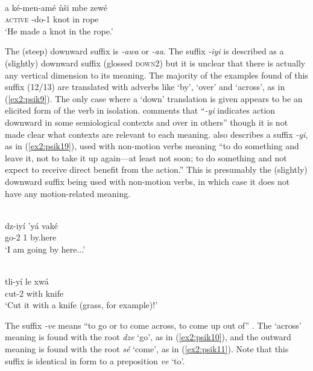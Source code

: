 \ea\label{ex2:psik8}
 \\
\gll a ké-men-amé ǹši mbe zewé	\\
\textsc{active} -do-1 knot in rope	\\
\glt `He made a knot in the rope.'
\z 

The (steep) downward suffix is \textit{-awa} or \textit{-aa}. The suffix \textit{-iyi} is described as a (slightly) downward suffix (glossed \textsc{down2}) but it is unclear that there is actually any vertical dimension to its meaning. The majority of the examples found of this suffix (12/13) are translated with adverbs like `by', `over' and `across', as in (\ref{ex2:psik9}). The only case where a `down' translation is given appears to be an elicited form of the verb in isolation. \citet[139]{smithKapsikiLanguage1969} comments that ``\textit{-yi} indicates action downward in some semiological contexts and over in others'' though it is not made clear what contexts are relevant to each meaning. \citet[114--115]{smithKapsikiLanguage1969} also describes a suffix \textit{-yi}, as in (\ref{ex2:psik19}), used with non-motion verbs meaning ``to do something and leave it, not to take it up again---at least not soon; to do something and not expect to receive direct benefit from the action.'' This is presumably the (slightly) downward suffix being used with non-motion verbs, in which case it does not have any motion-related meaning. 

\ea\label{ex2:psik9}
 \\
\gll dz-iyí 'yá vaké \\
go-2 1 by.here \\
\glt `I am going by here...'

\ex\label{ex2:psik19} 
 \\
\gll  tli-yí le xwá \\
cut-2 with knife \\
\glt `Cut it with a knife (grass, for example)!'
\z 

The suffix \textit{-ve} means ``to go or to come across, to come up out of'' \citep[118]{smithKapsikiLanguage1969}. The `across' meaning is found with the root \textit{dze} `go', as in (\ref{ex2:psik10}), and the outward meaning is found with the root \textit{sé} `come', as in (\ref{ex2:psik11}). Note that this suffix is identical in form to a preposition \textit{ve} `to'. 

